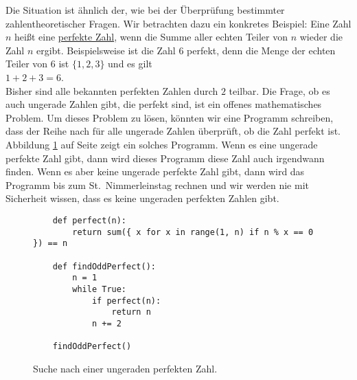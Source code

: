 Die Situation ist ähnlich der, wie bei der Überprüfung bestimmter zahlentheoretischer
Fragen.  Wir betrachten dazu ein konkretes Beispiel: Eine Zahl $n$ heißt 
eine \href{https://de.wikipedia.org/wiki/Vollkommene_Zahl}{perfekte Zahl},
wenn die Summe aller echten Teiler von $n$ wieder die Zahl $n$ ergibt.  Beispielsweise ist
die Zahl $6$ perfekt, denn die Menge der echten Teiler von $6$ ist $\{1,2,3\}$ und es gilt
\\[0.2cm]
\hspace*{1.3cm}
$1 + 2 + 3 = 6$.
\\[0.2cm]
Bisher sind alle bekannten perfekten Zahlen durch $2$ teilbar.  Die Frage, ob es auch
ungerade Zahlen gibt, die perfekt sind, ist ein offenes mathematisches Problem.  Um dieses
Problem zu lösen, könnten wir eine Programm schreiben, dass der Reihe nach für alle
ungerade Zahlen überprüft, ob die Zahl perfekt ist.  Abbildung \ref{fig:Find-Perfect.ipynb}
auf Seite \pageref{fig:Find-Perfect.ipynb} zeigt ein solches Programm.  Wenn es eine ungerade perfekte Zahl
gibt, dann wird dieses Programm diese Zahl auch irgendwann finden.  Wenn es aber keine
ungerade perfekte Zahl gibt, dann wird das Programm bis zum St.~Nimmerleinstag rechnen und
wir werden nie mit Sicherheit wissen, dass es keine ungeraden perfekten Zahlen gibt.

\begin{figure}[!ht]
  \centering
\begin{verbatim}
    def perfect(n):
        return sum({ x for x in range(1, n) if n % x == 0 }) == n
    
    def findOddPerfect():
        n = 1
        while True:
            if perfect(n):
                return n
            n += 2
    
    findOddPerfect()
\end{verbatim}
\vspace*{-0.3cm}
  \caption{Suche nach einer ungeraden perfekten Zahl.}
  \label{fig:Find-Perfect.ipynb}
\end{figure} 

